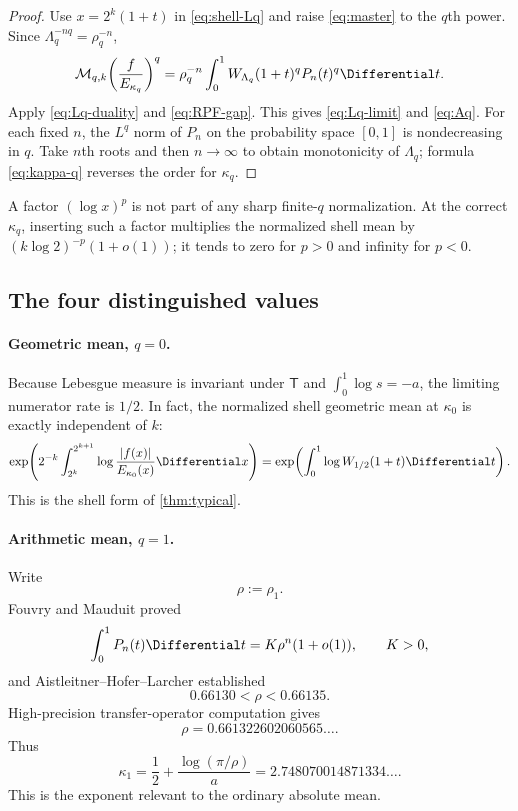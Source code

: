\documentclass[11pt,oneside]{article}
\theoremstyle{definition}
\theoremstyle{remark}
\newcommand{\T}{\mathsf T}
\begin{document}
\begin{proof}
Use $x=2^k(1+t)$ in \eqref{eq:shell-Lq} and raise
\eqref{eq:master} to the $q$th power.  Since
$\Lambda_q^{-nq}=\rho_q^{-n}$,
\[
 \mathcal M_{q,k}\!\left(\frac{f}{E_{\kappa_q}}\right)^q
 =\rho_q^{-n}\int_0^1W_{\Lambda_q}(1+t)^qP_n(t)^q\Differential t.
\]
Apply \eqref{eq:Lq-duality} and \eqref{eq:RPF-gap}.  This gives
\eqref{eq:Lq-limit} and \eqref{eq:Aq}.  For each fixed $n$, the $L^q$ norm of
$P_n$ on the probability space $[0,1]$ is nondecreasing in $q$.  Take $n$th
roots and then $n\to\infty$ to obtain monotonicity of $\Lambda_q$; formula
\eqref{eq:kappa-q} reverses the order for $\kappa_q$.
\end{proof}

A factor $(\log x)^p$ is not part of any sharp finite-$q$ normalization.  At
the correct $\kappa_q$, inserting such a factor multiplies the normalized
shell mean by $(k\log2)^{-p}(1+o(1))$; it tends to zero for $p>0$ and infinity
for $p<0$.

\subsection{The four distinguished values}

\paragraph{Geometric mean, $q=0$.}
Because Lebesgue measure is invariant under $\T$ and
$\int_0^1\log s=-a$, the limiting numerator rate is $1/2$.  In fact, the
normalized shell geometric mean at $\kappa_0$ is exactly independent of $k$:
\begin{equation}
 \exp\!\left(2^{-k}\int_{2^k}^{2^{k+1}}
 \log\frac{|f(x)|}{E_{\kappa_0}(x)}\Differential x\right)
 =\exp\!\left(\int_0^1\log W_{1/2}(1+t)\Differential t\right).
 \label{eq:geometric-exact}
\end{equation}
This is the shell form of \cref{thm:typical}.

\paragraph{Arithmetic mean, $q=1$.}
Write
\begin{equation}
 \rho:=\rho_1.
 \label{eq:rho}
\end{equation}
Fouvry and Mauduit proved
\begin{equation}
 \int_0^1P_n(t)\Differential t=K\rho^n(1+o(1)),
 \qquad K>0,
 \label{eq:FM}
\end{equation}
and Aistleitner--Hofer--Larcher established
\begin{equation}
 0.66130<\rho<0.66135.
 \label{eq:rho-certified}
\end{equation}
High-precision transfer-operator computation gives
\begin{equation}
 \rho=0.661322602060565\ldots .
 \label{eq:rho-numeric}
\end{equation}
Thus
\begin{equation}
 \boxed{
 \kappa_1=\frac12+\frac{\log(\pi/\rho)}a
 =2.748070014871334\ldots .}
 \label{eq:kappa1}
\end{equation}
This is the exponent relevant to the ordinary absolute mean.
\end{document}
